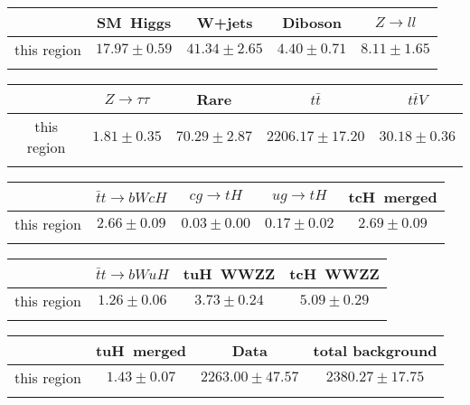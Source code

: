 \centering
\begin{tabular}{ccccc} \toprule\toprule
 & SM~Higgs & W+jets & Diboson & $Z\to ll$\\\midrule
this region & $17.97\pm0.59$ & $41.34\pm2.65$ & $4.40\pm0.71$ & $8.11\pm1.65$\\
\bottomrule\bottomrule\\
\end{tabular}
\begin{tabular}{ccccc} \toprule\toprule
 & $Z\to \tau\tau$ & Rare & $t\bar{t}$ & $t\bar{t}V$\\\midrule
this region & $1.81\pm0.35$ & $70.29\pm2.87$ & $2206.17\pm17.20$ & $30.18\pm0.36$\\
\bottomrule\bottomrule\\
\end{tabular}
\begin{tabular}{ccccc} \toprule\toprule
 & $\bar{t}t\to bWcH$ & $cg\to tH$ & $ug\to tH$ & tcH~merged\\\midrule
this region & $2.66\pm0.09$ & $0.03\pm0.00$ & $0.17\pm0.02$ & $2.69\pm0.09$\\
\bottomrule\bottomrule\\
\end{tabular}
\begin{tabular}{cccc} \toprule\toprule
 & $\bar{t}t\to bWuH$ & tuH~WWZZ & tcH~WWZZ\\\midrule
this region & $1.26\pm0.06$ & $3.73\pm0.24$ & $5.09\pm0.29$\\
\bottomrule\bottomrule\\
\end{tabular}
\begin{tabular}{cccc} \toprule\toprule
 & tuH~merged & Data & total background\\\midrule
this region & $1.43\pm0.07$ & $2263.00\pm47.57$ & $2380.27\pm17.75$\\
\bottomrule\bottomrule\\
\end{tabular}
